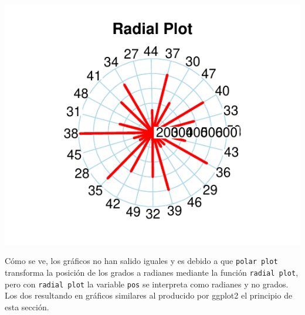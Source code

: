 \documentclass{article}\usepackage[]{graphicx}\usepackage[]{color}
\makeatletter
\def\maxwidth{ %
  \ifdim\Gin@nat@width>\linewidth
    \linewidth
  \else
    \Gin@nat@width
  \fi
}
\newenvironment{knitrout}{}{} %
\makeatother
\begin{document}
\begin{knitrout}
{\centering \includegraphics[width=\maxwidth]{figure/plot_plotrix_cr-2} 

}



\end{knitrout}
C\'omo se ve, los gr\'aficos no han salido iguales y es debido a que \texttt{polar plot} transforma la posici\'on de los grados a radianes mediante la funci\'on \texttt{radial plot}, pero con \texttt{radial plot} la variable \texttt{pos} se interpreta como radianes y no grados.~\\
Los dos resultando en gr\'aficos similares al producido por ggplot2 el principio de esta secci\'on.
\clearpage
\end{document}

